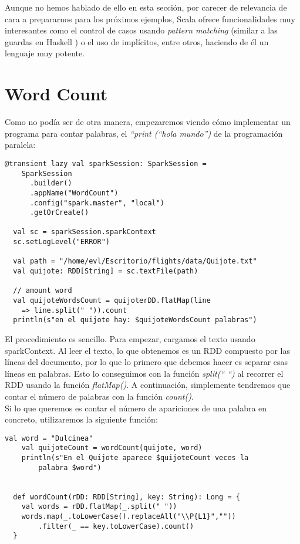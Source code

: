Aunque no hemos hablado de ello en esta sección, por carecer de relevancia de cara a prepararnos para los próximos ejemplos, Scala ofrece funcionalidades muy interesantes como el control de casos usando \textit{pattern matching} (similar a las guardas en Haskell ) o el uso de implícitos, entre otros, haciendo de él un lenguaje muy potente. 

\section{Word Count}

Como no podía ser de otra manera, empezaremos viendo cómo implementar un programa para contar palabras, el \textit{“print (“hola mundo”)} de la programación paralela:\\

\begin{lstlisting}[frame=single]
  @transient lazy val sparkSession: SparkSession =
    SparkSession
      .builder()
      .appName("WordCount")
      .config("spark.master", "local")
      .getOrCreate()
      
  val sc = sparkSession.sparkContext
  sc.setLogLevel("ERROR")

  val path = "/home/evl/Escritorio/flights/data/Quijote.txt"
  val quijote: RDD[String] = sc.textFile(path)

  // amount word
  val quijoteWordsCount = quijoterDD.flatMap(line 
  	=> line.split(" ")).count
  println(s"en el quijote hay: $quijoteWordsCount palabras")

\end{lstlisting}

El procedimiento es sencillo. Para empezar, cargamos el texto usando sparkContext. Al leer el texto, lo que obtenemos es un RDD compuesto por las líneas del documento, por lo que lo primero que debemos hacer es separar esas líneas en palabras. Esto lo conseguimos con la función \textit{split(“ “)} al recorrer el RDD usando la función \textit{flatMap()}. A continuación, simplemente tendremos que contar el número de palabras con la función \textit{count()}.\\

Si lo que queremos es contar el número de apariciones de una palabra en concreto, utilizaremos la siguiente función:\\

\begin{lstlisting}[frame=single]
    val word = "Dulcinea"
    val quijoteCount = wordCount(quijote, word)
    println(s"En el Quijote aparece $quijoteCount veces la 
    	palabra $word")
    
    
  def wordCount(rDD: RDD[String], key: String): Long = {
    val words = rDD.flatMap(_.split(" "))
    words.map(_.toLowerCase().replaceAll("\\P{L1}",""))
    	.filter(_ == key.toLowerCase).count()
  }
    
\end{lstlisting}

